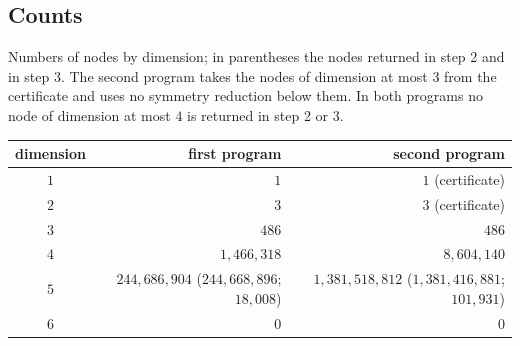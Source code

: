 \documentclass[11pt]{article}
\theoremstyle{definition}
\begin{document}
\subsection{Counts}
Numbers of nodes by dimension; in parentheses the nodes returned in step 2
and in step 3. The second program takes the nodes of dimension at most $3$ from the certificate
and uses no symmetry reduction below them. In both programs no node of dimension at most $4$ is
returned in step 2 or 3.
\begin{center}
\begin{tabular}{crr}\toprule
dimension & first program & second program\\\midrule
$1$ & $1$ & $1$ (certificate)\\
$2$ & $3$ & $3$ (certificate)\\
$3$ & $486$ & $486$\\
$4$ & $1{,}466{,}318$ & $8{,}604{,}140$\\
$5$ & $244{,}686{,}904$ ($244{,}668{,}896$; $18{,}008$) & $1{,}381{,}518{,}812$ ($1{,}381{,}416{,}881$; $101{,}931$)\\
$6$ & $0$ & $0$\\\bottomrule
\end{tabular}
\end{center}
\end{document}
